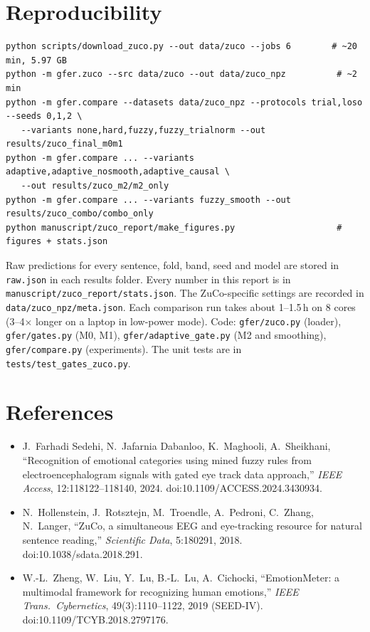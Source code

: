 \documentclass[10pt,a4paper]{article}
\begin{document}
\section{Reproducibility}
\begin{small}
\begin{verbatim}
python scripts/download_zuco.py --out data/zuco --jobs 6        # ~20 min, 5.97 GB
python -m gfer.zuco --src data/zuco --out data/zuco_npz          # ~2 min
python -m gfer.compare --datasets data/zuco_npz --protocols trial,loso --seeds 0,1,2 \
   --variants none,hard,fuzzy,fuzzy_trialnorm --out results/zuco_final_m0m1
python -m gfer.compare ... --variants adaptive,adaptive_nosmooth,adaptive_causal \
   --out results/zuco_m2/m2_only
python -m gfer.compare ... --variants fuzzy_smooth --out results/zuco_combo/combo_only
python manuscript/zuco_report/make_figures.py                    # figures + stats.json
\end{verbatim}
\end{small}
Raw predictions for every sentence, fold, band, seed and model are stored in \texttt{raw.json} in each results folder. Every number in this report is in \texttt{manuscript/zuco\_report/stats.json}. The ZuCo-specific settings are recorded in \texttt{data/zuco\_npz/meta.json}. Each comparison run takes about 1--1.5\,h on 8 cores (3--4$\times$ longer on a laptop in low-power mode). Code: \texttt{gfer/zuco.py} (loader), \texttt{gfer/gates.py} (M0, M1), \texttt{gfer/adaptive\_gate.py} (M2 and smoothing), \texttt{gfer/compare.py} (experiments). The unit tests are in \texttt{tests/test\_gates\_zuco.py}.

\section*{References}
\begin{small}
\begin{itemize}
  \item J.~Farhadi Sedehi, N.~Jafarnia Dabanloo, K.~Maghooli, A.~Sheikhani, ``Recognition of emotional categories using mined fuzzy rules from electroencephalogram signals with gated eye track data approach,'' \emph{IEEE Access}, 12:118122--118140, 2024. doi:10.1109/ACCESS.2024.3430934.
  \item N.~Hollenstein, J.~Rotsztejn, M.~Troendle, A.~Pedroni, C.~Zhang, N.~Langer, ``ZuCo, a simultaneous EEG and eye-tracking resource for natural sentence reading,'' \emph{Scientific Data}, 5:180291, 2018. doi:10.1038/sdata.2018.291.
  \item W.-L.~Zheng, W.~Liu, Y.~Lu, B.-L.~Lu, A.~Cichocki, ``EmotionMeter: a multimodal framework for recognizing human emotions,'' \emph{IEEE Trans.\ Cybernetics}, 49(3):1110--1122, 2019 (SEED-IV). doi:10.1109/TCYB.2018.2797176.
\end{itemize}
\end{small}
\end{document}

